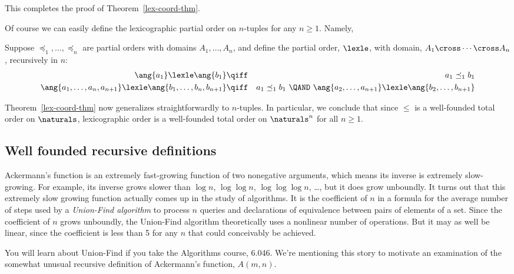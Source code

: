 This completes the proof of Theorem~\ref{lex-coord-thm}.


Of course \iffalse the values of states for the robot in the previous
section were triples not pairs, but\fi
we can easily define the
lexicographic partial order on $n$-tuples for any $n\ge 1$.  Namely,
\begin{definition}\label{lexn}
  Suppose $\preceq_1,\dots, \preceq_n$ are partial orders with domains
  $A_1, \dots, A_n$, and define the partial order, $\lexle$, with domain,
  $A_1 \cross \cdots \cross A_n$, recursively in $n$:
\begin{eqnarray*}
\ang{a_1} \lexle \ang{b_1} &\qiff& a_1 \preceq_1 b_1\\
\ang{a_1,\dots,a_n,a_{n+1}} \lexle \ang{b_1,\dots,b_n,b_{n+1}} &\qiff&
  a_1 \preceq_1 b_1\ \QAND\
    \ang{a_2,\dots,a_{n+1}} \lexle \ang{b_2,\dots,b_{n+1}}
\end{eqnarray*}
\end{definition}
Theorem~\ref{lex-coord-thm} now generalizes straightforwardly to
$n$-tuples.  In particular, we conclude that since $\le$ is a well-founded
total order on $\naturals$, lexicographic order is a well-founded total
order on $\naturals^n$ for all $n \ge 1$.


\subsection{Well founded recursive definitions}

Ackermann's function is an extremely fast-growing function of two
nonegative arguments, which means its inverse is extremely slow-growing.
For example, its inverse grows slower than $\log n$, $\log \log n$, $\log
\log \log n$, \dots, but it does grow unboundly.  It turns out that this
extremely slow growing function actually comes up in the study of
algorithms.  It is the coefficient of $n$ in a formula for the average
number of steps used by a \emph{Union-Find algorithm} to process $n$
queries and declarations of equivalence between pairs of elements of a
set.  Since the coefficient of $n$ grows unboundly, the Union-Find
algorithm theoretically uses a nonlinear number of operations.  But it may
as well be linear, since the coefficient is less than 5 for any $n$ that
could conceivably be achieved.

You will learn about Union-Find if you take the Algorithms course, 6.046.
We're mentioning this story to motivate an examination of the somewhat
unusual recursive definition of Ackermann's function, $A(m,n)$.

